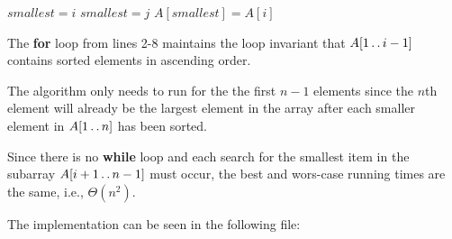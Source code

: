 
\begin{algorithmic}[1]
        \STATE $\mathit{smallest} = i$
                \STATE $\mathit{smallest} = j$
            \ENDIF
        \ENDFOR
        \STATE $A[\mathit{smallest}] = A[i]$
    \ENDFOR
\end{algorithmic}

The \textbf{for} loop from lines 2-8 maintains the loop invariant that $A[1\mathinner{{\ldotp}\,{\ldotp}} i-1]$
contains sorted elements in ascending order. 

The algorithm only needs to run for the the first $n - 1$ elements since the $n$th 
element will already be the largest element in the array after each smaller element 
in $A[1\mathinner{{\ldotp}\,{\ldotp}} n]$ has been sorted.

Since there is no \textbf{while} loop and each search for the smallest item in the subarray
$A[i + 1\mathinner{{\ldotp}\,{\ldotp}} n - 1]$ must occur, the best and wors-case running times are the same,
i.e., $\Theta(n^2)$.

The implementation can be seen in the following file:

